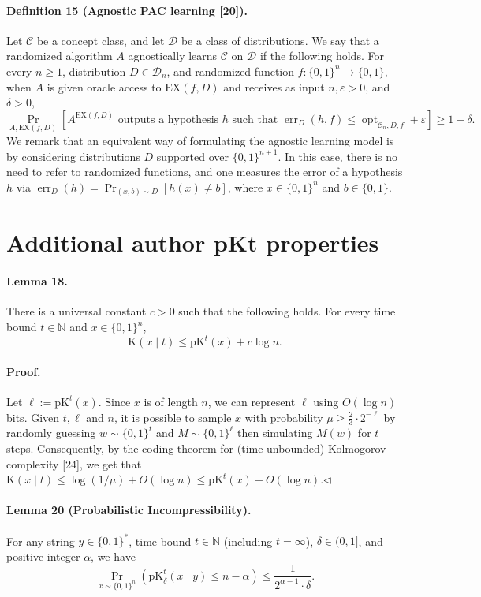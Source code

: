\documentclass[10pt,a4paper]{article}
\begin{document}
\paragraph{Definition 15 (Agnostic PAC learning [20]).} Let $\mathcal C$ be a concept class, and let $\mathcal D$ be a class of distributions. We say that a randomized algorithm $A$ agnostically learns $\mathcal C$ on $\mathcal D$ if the following holds. For every $n\geq1$, distribution $D\in\mathcal D_n$, and randomized function $f:\{0,1\}^n\to\{0,1\}$, when $A$ is given oracle access to $\mathrm{EX}(f,D)$ and receives as input $n,\varepsilon>0$, and $\delta>0$,
\[\Pr_{A,\mathrm{EX}(f,D)}[A^{\mathrm{EX}(f,D)}\text{ outputs a hypothesis }h\text{ such that }\operatorname{err}_D(h,f)\leq\operatorname{opt}_{\mathcal C_n,D,f}+\varepsilon]\geq1-\delta.\]
We remark that an equivalent way of formulating the agnostic learning model is by considering distributions $D$ supported over $\{0,1\}^{n+1}$. In this case, there is no need to refer to randomized functions, and one measures the error of a hypothesis $h$ via $\operatorname{err}_D(h)=\Pr_{(x,b)\sim D}[h(x)\neq b]$, where $x\in\{0,1\}^n$ and $b\in\{0,1\}$.
\section*{Additional author pKt properties}
\paragraph{Lemma 18.} There is a universal constant $c>0$ such that the following holds. For every time bound $t\in\mathbb N$ and $x\in\{0,1\}^n$,
\[\mathrm K(x\mid t)\leq\mathrm{pK}^t(x)+c\log n.\]
\paragraph{Proof.} Let $\ell:=\mathrm{pK}^t(x)$. Since $x$ is of length $n$, we can represent $\ell$ using $O(\log n)$ bits. Given $t,\ell$ and $n$, it is possible to sample $x$ with probability $\mu\geq\frac23\cdot2^{-\ell}$ by randomly guessing $w\sim\{0,1\}^t$ and $M\sim\{0,1\}^\ell$ then simulating $M(w)$ for $t$ steps. Consequently, by the coding theorem for (time-unbounded) Kolmogorov complexity [24], we get that $\mathrm K(x\mid t)\leq\log(1/\mu)+O(\log n)\leq\mathrm{pK}^t(x)+O(\log n)$.\hfill$\triangleleft$
\paragraph{Lemma 20 (Probabilistic Incompressibility).} For any string $y\in\{0,1\}^*$, time bound $t\in\mathbb N$ (including $t=\infty$), $\delta\in(0,1]$, and positive integer $\alpha$, we have
\[\Pr_{x\sim\{0,1\}^n}(\mathrm{pK}_\delta^t(x\mid y)\leq n-\alpha)\leq\frac1{2^{\alpha-1}\cdot\delta}.\]
\end{document}
